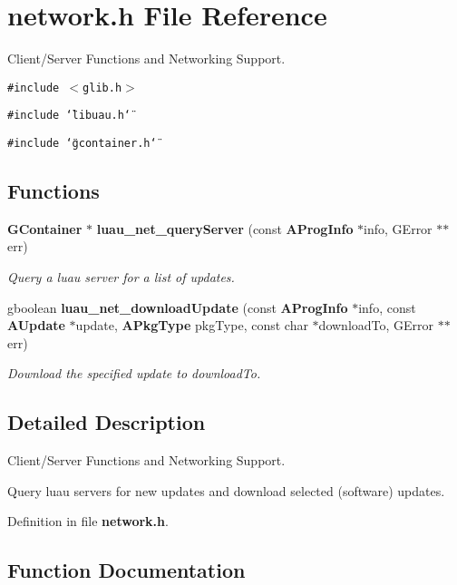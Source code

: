 \section{network.h File Reference}
\label{network_8h}
Client/Server Functions and Networking Support.  


{\tt \#include $<$glib.h$>$}\par
{\tt \#include \char`\"{}libuau.h\char`\"{}}\par
{\tt \#include \char`\"{}gcontainer.h\char`\"{}}\par
\subsection*{Functions}
\begin{CompactItemize}
\item 
{\bf GContainer} $\ast$ {\bf luau\_\-net\_\-query\-Server} (const {\bf AProg\-Info} $\ast$info, GError $\ast$$\ast$err)
\begin{CompactList}\small\item\em Query a luau server for a list of updates. \item\end{CompactList}\item 
gboolean {\bf luau\_\-net\_\-download\-Update} (const {\bf AProg\-Info} $\ast$info, const {\bf AUpdate} $\ast$update, {\bf APkg\-Type} pkg\-Type, const char $\ast$download\-To, GError $\ast$$\ast$err)
\begin{CompactList}\small\item\em Download the specified update to download\-To. \item\end{CompactList}\end{CompactItemize}


\subsection{Detailed Description}
Client/Server Functions and Networking Support. 

Query luau servers for new updates and download selected (software) updates.

Definition in file {\bf network.h}.

\subsection{Function Documentation}
